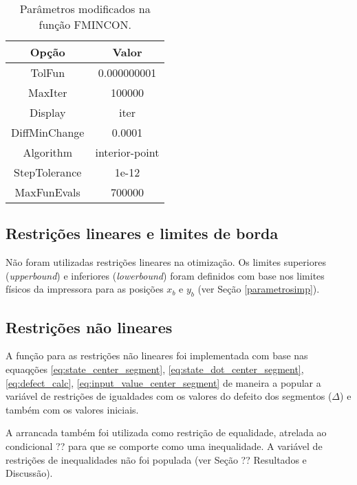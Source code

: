 \begin{table}
    \begin{center}
    \caption{Parâmetros modificados na função FMINCON.}
    \label{tab:fmincon_options}
    \begin{tabular}{c c}
        Opção & Valor \\ \hline
        TolFun & 0.000000001 \\
        MaxIter & 100000 \\
        Display & iter \\
        DiffMinChange & 0.0001 \\
        Algorithm & interior-point \\
        StepTolerance & 1e-12 \\
        MaxFunEvals & 700000  \\ \hline
    \end{tabular}
    \end{center}
\end{table}

\subsection{Restrições lineares e limites de borda}

Não foram utilizadas restrições lineares na otimização. Os limites superiores (\textit{upperbound}) e inferiores (\textit{lowerbound}) foram definidos com base nos limites físicos da impressora para as posições $x_b$ e $y_b$ (ver Seção \ref{parametrosimp}).

\subsection{Restrições não lineares}

A função para as restrições não lineares foi implementada com base nas equaqções \ref{eq:state_center_segment},
\ref{eq:state_dot_center_segment}, \ref{eq:defect_calc}, \ref{eq:input_value_center_segment} de maneira a
popular a variável de restrições de igualdades com os valores do defeito dos segmentos ($\Delta$) e também
com os valores iniciais. 

A arrancada também foi utilizada como restrição de equalidade, atrelada ao condicional ?? para que se comporte como uma inequalidade.
A variável de restrições de inequalidades não foi populada (ver Seção ?? Resultados e Discussão).


